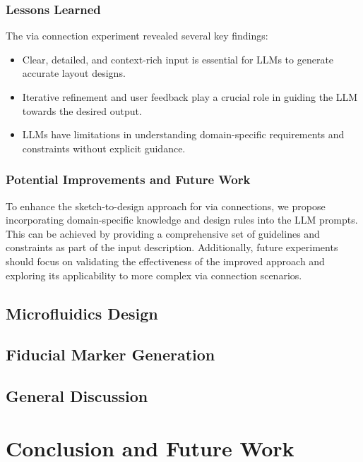 \documentclass{article}
\begin{document}
\subsubsection{Lessons Learned}
The via connection experiment revealed several key findings:
\begin{itemize}
\item Clear, detailed, and context-rich input is essential for LLMs to generate accurate layout designs.
\item Iterative refinement and user feedback play a crucial role in guiding the LLM towards the desired output.
\item LLMs have limitations in understanding domain-specific requirements and constraints without explicit guidance.
\end{itemize}
\subsubsection{Potential Improvements and Future Work}
To enhance the sketch-to-design approach for via connections, we propose incorporating domain-specific knowledge and design rules into the LLM prompts. This can be achieved by providing a comprehensive set of guidelines and constraints as part of the input description. Additionally, future experiments should focus on validating the effectiveness of the improved approach and exploring its applicability to more complex via connection scenarios.

\subsection{Microfluidics Design}

\subsection{Fiducial Marker Generation}

\subsection{General Discussion}

\section{Conclusion and Future Work}

\printbibliography %
\end{document}
